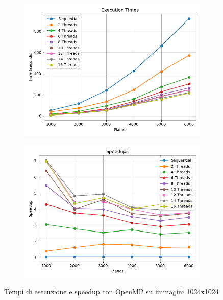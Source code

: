 \begin{figure}[H]
    \centering
    \begin{subfigure}{0.49\textwidth}
        \centering
        \includegraphics[width=\textwidth]{../result_16/csv/test10000/plots/1024/results_times}
    \end{subfigure}
    \begin{subfigure}{0.49\textwidth}
        \centering
        \includegraphics[width=\textwidth]{../result_16/csv/test10000/plots/1024/results_speedup}
    \end{subfigure}
    \caption{Tempi di esecuzione e speedup con OpenMP su immagini 1024x1024}
    \label{fig:omp_10000_1024}
\end{figure}
